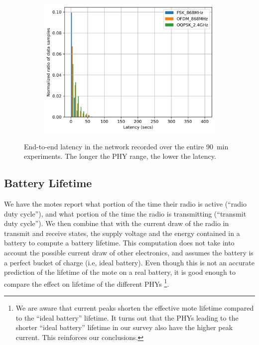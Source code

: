 \documentclass[sensors,article,submit,moreauthors,pdftex]{Definitions/mdpi}
\begin{document}
\begin{figure}
\begin{subfigure}{0.49\columnwidth}
    	\includegraphics[width=1.00\columnwidth]{latency_pdf}
    	\label{fig:latency_pdf}
	\end{subfigure}
	\caption{
	    End-to-end latency in the network recorded over the entire 90~min experiments.
	    The longer the PHY range, the lower the latency.
	}
	\label{fig:latency_all}
\end{figure}

\subsection{Battery Lifetime}
\label{sec:res_lifetime}


We have the motes report what portion of the time their radio is active (``radio duty cycle''), and what portion of the time the radio is transmitting (``transmit duty cycle'').
We then combine that with the current draw of the radio in transmit and receive states, the supply voltage and the energy contained in a battery to compute a battery lifetime.
This computation does not take into account the possible current draw of other electronics, and assumes the battery is a perfect bucket of charge (i.e, ideal battery).
Even though this is not an accurate prediction of the lifetime of the mote on a real battery, it is good enough to compare the effect on lifetime of the different PHYs 
    \footnote{We are aware that current peaks shorten the effective mote lifetime compared to the ``ideal battery'' lifetime.
    It turns out that the PHYs leading to the shorter ``ideal battery'' lifetime in our survey also have the higher peak current. This reinforces our conclusions.}.
\end{document}

